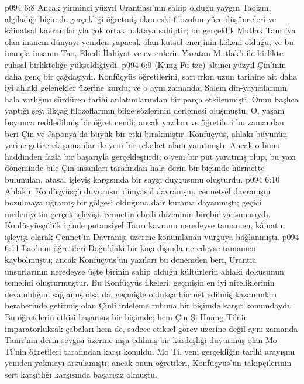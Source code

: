 \vs p094 6:8 Ancak yirminci yüzyıl Urantiası'nın sahip olduğu yaygın Taoizm, algıladığı biçimde gerçekliği öğretmiş olan eski filozofun yüce düşünceleri ve kâinatsal kavramlarıyla çok ortak noktaya sahiptir; bu gerçeklik Mutlak Tanrı’ya olan inancın dünyayı yeniden yapacak olan kutsal enerjinin kökeni olduğu, ve bu inançla insanın Tao, Ebedi İlahiyat ve evrenlerin Yaratan Mutlak’ı ile birlikte ruhsal birlikteliğe yükseldiğiydi.
\vs p094 6:9  (Kung Fu\hyp{}tze) altıncı yüzyıl Çin’inin daha genç bir çağdaşıydı. Konfüçyüs öğretilerini, sarı ırkın uzun tarihine ait daha iyi ahlaki gelenekler üzerine kurdu; ve o aynı zamanda, Salem din\hyp{}yayıcılarının hala varlığını sürdüren tarihi anlatımlarından bir parça etkilenmişti. Onun başlıca yaptığı şey, ilkçağ filozoflarının bilge sözlerinin derlemesi oluşmuştu. O, yaşam boyunca reddedilmiş bir öğretmendi; ancak yazıları ve öğretileri bu zamandan beri Çin ve Japonya’da büyük bir etki bırakmıştır. Konfüçyüs, ahlakı büyünün yerine getirerek şamanlar ile yeni bir rekabet alanı yaratmıştı. Ancak o bunu haddinden fazla bir başarıyla gerçekleştirdi; o  yeni bir put yaratmış olup, bu yazı döneminde bile Çin insanları tarafından hala derin bir biçimde hürmette bulunulan, atasal işleyiş karşısında bir saygı duygusunu oluşturdu.
\vs p094 6:10 Ahlakın Konfüçyüsçü duyurusu; dünyasal davranışın, cennetsel davranışın bozulmaya uğramış bir gölgesi olduğuna dair kurama dayanmıştı; geçici medeniyetin gerçek işleyişi, cennetin ebedi düzeninin birebir yansımasıydı. Konfüsyüsçülük içinde potansiyel Tanrı kavramı neredeyse tamamen, kâinatın işleyişi olarak Cennet’in Davranışı üzerine konumlanan vurguya bağlanmıştı.
\vs p094 6:11 Lao’nun öğretileri Doğu’daki bir kaçı dışında neredeyse tamamen kaybolmuştu; ancak Konfüçyüs’ün yazıları bu dönemden beri, Urantia unsurlarının neredeyse üçte birinin sahip olduğu kültürlerin ahlaki dokusunun temelini oluşturmuştur. Bu Konfüçyüs ilkeleri, geçmişin en iyi niteliklerinin devamlılığını sağlamış olsa da, geçmişte oldukça hürmet edilmiş kazanımları beraberinde getirmiş olan Çinli irdeleme ruhuna bir biçimde karşıt konumdaydı. Bu öğretilerin etkisi başarısız bir biçimde; hem Çin Şi Huang Ti’nin imparatorluksak çabaları hem de, sadece etiksel görev üzerine değil aynı zamanda Tanrı’nın derin sevgisi üzerine inşa edilmiş bir kardeşliği duyurmuş olan Mo Ti’nin öğretileri tarafından karşı konuldu. Mo Ti, yeni gerçekliğin tarihi arayışını yeniden yakmayı arzulamıştı; ancak onun öğretileri, Konfüçyüs’ün takipçilerinin sert karşıtlığı karşısında başarısız olmuştu.
